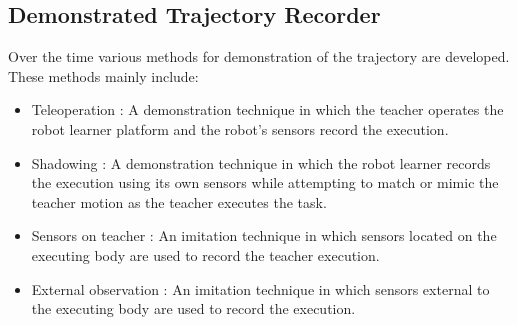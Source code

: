 \subsection{Demonstrated Trajectory Recorder}
Over the time various methods for demonstration of the trajectory are developed.
These methods mainly include:
\begin{itemize} 
	
	\item Teleoperation : A demonstration technique in which the teacher operates the robot learner platform and the robot’s sensors record the execution\cite{argall2009survey}.	
	
	\item Shadowing : A demonstration technique in which the robot learner records the execution using its own sensors while attempting to match or mimic the teacher motion as the teacher executes the task\cite{argall2009survey}.
	
	\item Sensors on teacher : An imitation technique in which sensors located on the executing body are used to record the teacher execution\cite{argall2009survey}.
	
	\item External observation : An imitation technique in which sensors external to the executing body are used to record the execution\cite{argall2009survey}.
	
\end{itemize}
